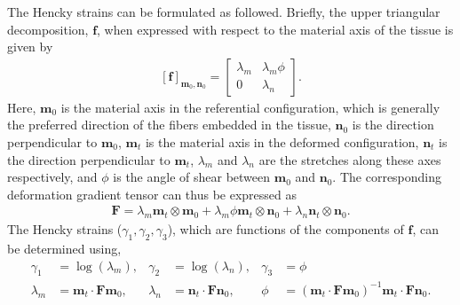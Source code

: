     
    The Hencky strains can be formulated as followed. Briefly, the upper triangular decomposition, $\mathbf{f}$, when expressed with respect to the material axis of the tissue is given by
\begin{equation}
\begin{aligned}
\left[\mathbf{f}\right]_{\mathbf{m}_0,\mathbf{n}_0} = \begin{bmatrix}
\lambda_m 	& \lambda_m\phi \\
0			& \lambda_n
\end{bmatrix}.
\end{aligned}\label{eqn:uppertriangulardecomposition}
\end{equation}
Here, $\mathbf{m}_0$ is the material axis in the referential configuration, which is generally the preferred direction of the fibers embedded in the tissue, $\mathbf{n}_0$ is the direction perpendicular to $\mathbf{m}_0$, $\mathbf{m}_t$ is the material axis in the deformed configuration, $\mathbf{n}_t$ is the direction perpendicular to $\mathbf{m}_t$, $\lambda_m$ and $\lambda_n$ are the stretches along these axes respectively, and $\phi$ is the angle of shear between $\mathbf{m}_0$ and $\mathbf{n}_0$. The corresponding deformation gradient tensor can thus be expressed as 
\begin{equation}
\begin{aligned}
\mathbf{F} = \lambda_m\mathbf{m}_t\otimes\mathbf{m}_0 + \lambda_m\phi\mathbf{m}_t\otimes\mathbf{n}_0 + \lambda_n\mathbf{n}_t\otimes\mathbf{n}_0.
\end{aligned}
\end{equation}
The Hencky strains ($\gamma_1, \gamma_2, \gamma_3$), which are functions of the components of $\mathbf{f}$, can be determined using, 
\begin{subequations}\label{eqn:henckystrains}
\begin{align}
\gamma_1 &= \log(\lambda_m), &	\gamma_2 &= \log(\lambda_n), 	& \gamma_3 &= \phi	\\
\lambda_m &= \mathbf{m}_t\cdot\mathbf{F}\mathbf{m}_0, &	\lambda_n &= \mathbf{n}_t\cdot\mathbf{F}\mathbf{n}_0,	&	\phi &= \left(\mathbf{m}_t\cdot\mathbf{F}\mathbf{m}_0\right)^{-1}\mathbf{m}_t\cdot\mathbf{F}\mathbf{n}_0.
\end{align}
\end{subequations}
    
